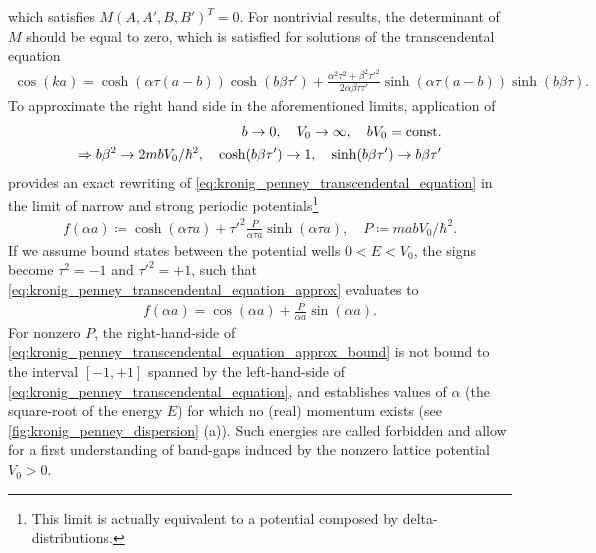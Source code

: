which satisfies $M(A,A',B,B')^T=0$.
For nontrivial results, the determinant of $M$ should be equal to zero, which is satisfied for solutions of the transcendental equation
\begin{align}
    \cos(ka)
    =
    \cosh(\alpha\tau(a-b))\cosh(b\beta\tau')
    +
    \frac{\alpha^2\tau^2+\beta^2\tau'^2}{2\alpha\beta\tau\tau'}\sinh(\alpha\tau(a-b))\sinh(b\beta\tau).
    \label{eq:kronig_penney_transcendental_equation}
\end{align}
To approximate the right hand side in the aforementioned limits, application of
\begin{align}
    b\rightarrow0,
    \quad
    V_0\rightarrow\infty,
    \quad
    bV_0 = {\rm const.}
    \\
    \Rightarrow
    b\beta^2\rightarrow 2mbV_0/\hbar^2,
    \quad
    \cosh(b\beta\tau')\rightarrow 1,
    \quad
    \sinh(b\beta\tau')\rightarrow b\beta\tau'
\end{align}
provides an exact rewriting of \cref{eq:kronig_penney_transcendental_equation} in the limit of narrow and strong periodic potentials\footnote{This limit is actually equivalent to a potential composed by delta-distributions.}
\begin{align}
    f(\alpha a) \coloneqq \cosh(\alpha\tau a) + \tau'^2\frac{P}{\alpha\tau a}\sinh(\alpha\tau a),
    \quad
    P \coloneqq mabV_0/\hbar^2.
    \label{eq:kronig_penney_transcendental_equation_approx}
\end{align}
If we assume bound states between the potential wells $0<E<V_0$, the signs become $\tau^2=-1$ and $\tau'^2=+1$, such that \cref{eq:kronig_penney_transcendental_equation_approx} evaluates to
\begin{align}
    f(\alpha a) = \cos(\alpha a) + \frac{P}{\alpha a}\sin(\alpha a).
    \label{eq:kronig_penney_transcendental_equation_approx_bound}
\end{align}
For nonzero $P$, the right-hand-side of \cref{eq:kronig_penney_transcendental_equation_approx_bound} is not bound to the interval $[-1,+1]$ spanned by the left-hand-side of \cref{eq:kronig_penney_transcendental_equation}, and establishes values of $\alpha$ (the square-root of the energy $E$) for which no (real) momentum exists (see \cref{fig:kronig_penney_dispersion} (a)).
Such energies are called forbidden and allow for a first understanding of band-gaps induced by the nonzero lattice potential $V_0>0$.
